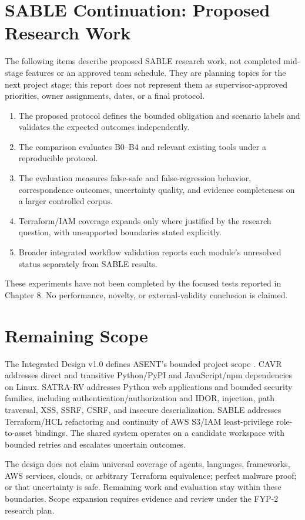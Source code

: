 \clearpage
\section{SABLE Continuation: Proposed Research Work}
The following items describe proposed SABLE research work, not completed mid-stage features or an approved team schedule. They are planning topics for the next project stage; this report does not represent them as supervisor-approved priorities, owner assignments, dates, or a final protocol.
\begin{enumerate}
    \item The proposed protocol defines the bounded obligation and scenario labels and validates the expected outcomes independently.
    \item The comparison evaluates B0--B4 and relevant existing tools under a reproducible protocol.
    \item The evaluation measures false-safe and false-regression behavior, correspondence outcomes, uncertainty quality, and evidence completeness on a larger controlled corpus.
    \item Terraform/IAM coverage expands only where justified by the research question, with unsupported boundaries stated explicitly.
    \item Broader integrated workflow validation reports each module's unresolved status separately from SABLE results.
\end{enumerate}
These experiments have not been completed by the focused tests reported in Chapter 8. No performance, novelty, or external-validity conclusion is claimed.

\section{Remaining Scope}
The Integrated Design v1.0 defines ASENT's bounded project scope \cite{asentIntegratedResearchDesign}. CAVR addresses direct and transitive Python/PyPI and JavaScript/npm dependencies on Linux. SATRA-RV addresses Python web applications and bounded security families, including authentication/authorization and IDOR, injection, path traversal, XSS, SSRF, CSRF, and insecure deserialization. SABLE addresses Terraform/HCL refactoring and continuity of AWS S3/IAM least-privilege role-to-asset bindings. The shared system operates on a candidate workspace with bounded retries and escalates uncertain outcomes.

The design does not claim universal coverage of agents, languages, frameworks, AWS services, clouds, or arbitrary Terraform equivalence; perfect malware proof; or that uncertainty is safe. Remaining work and evaluation stay within these boundaries. Scope expansion requires evidence and review under the FYP-2 research plan.


